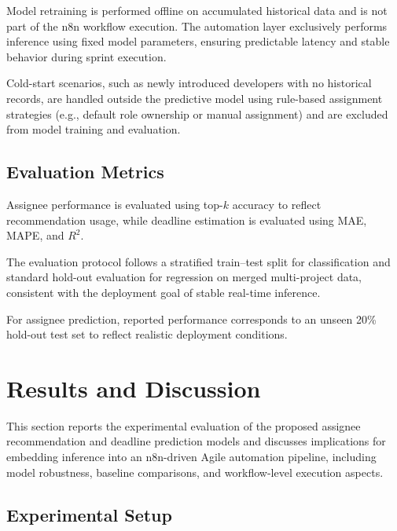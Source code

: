 \documentclass[conference]{IEEEtran}
\begin{document}
Model retraining is performed offline on accumulated historical data and is not part of the n8n workflow execution. The automation layer exclusively performs inference using fixed model parameters, ensuring predictable latency and stable behavior during sprint execution.

Cold-start scenarios, such as newly introduced developers with no historical records, are handled outside the predictive model using rule-based assignment strategies (e.g., default role ownership or manual assignment) and are excluded from model training and evaluation.


\subsection{Evaluation Metrics}

Assignee performance is evaluated using top-$k$ accuracy to reflect recommendation usage, while deadline estimation is evaluated using MAE, MAPE, and $R^2$.

The evaluation protocol follows a stratified train--test split for classification and standard hold-out evaluation for regression on merged multi-project data, consistent with the deployment goal of stable real-time inference.

For assignee prediction, reported performance corresponds to an unseen 20\% hold-out test set to reflect realistic deployment conditions.

\section{Results and Discussion}

This section reports the experimental evaluation of the proposed assignee recommendation and deadline prediction models and discusses implications for embedding inference into an n8n-driven Agile automation pipeline, including model robustness, baseline comparisons, and workflow-level execution aspects.

\subsection{Experimental Setup}
\end{document}
